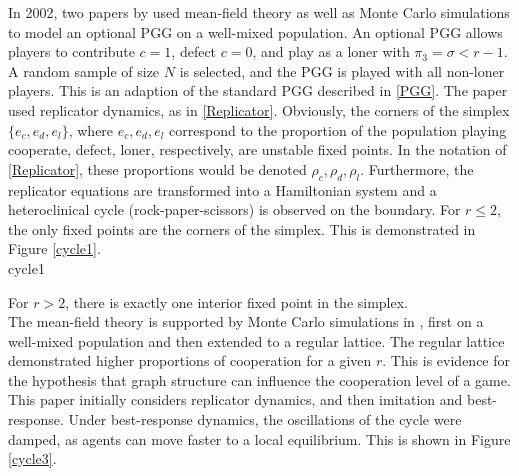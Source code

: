  In 2002, two papers by \cite{RN47, RN67} used mean-field theory as well as Monte Carlo simulations to model an optional PGG on a well-mixed population. An optional PGG allows players to contribute $c=1$, defect $c=0$, and play as a loner with $\pi_{3} = \sigma<r-1$. A random sample of size $N$ is selected, and the PGG is played with all non-loner players. This is an adaption of the standard PGG described in \ref{PGG}. The paper \cite{RN47} used replicator dynamics, as in \ref{Replicator}. Obviously, the corners of the simplex $\{e_c, e_d, e_l\}$, where $e_c, e_d, e_l$ correspond to the proportion of the population playing cooperate, defect, loner, respectively,  are unstable fixed points. In the notation of \eqref{Replicator}, these proportions would be denoted $\rho_c,\rho_d,\rho_l$. Furthermore, the replicator equations are transformed into a Hamiltonian system and a heteroclinical cycle (rock-paper-scissors) is observed on the boundary. For $r\leq 2$, the only fixed points are the corners of the simplex. This is demonstrated in Figure \ref{cycle1}. \\
  {cycle1}
 
 
 For $r>2$, there is exactly one interior fixed point in the simplex. \\
 \FloatBarrier
 \FloatBarrier
 The mean-field theory is supported by Monte Carlo simulations in \cite{RN67}, first on a well-mixed population and then extended to a regular lattice. The regular lattice demonstrated higher proportions of cooperation for a given $r$. This is evidence for the hypothesis that graph structure can influence the cooperation level of a game. This paper initially considers replicator dynamics, and then imitation and best-response. Under best-response dynamics, the oscillations of the cycle were damped, as agents can move faster to a local equilibrium. This is shown in Figure \ref{cycle3}. \\
 
